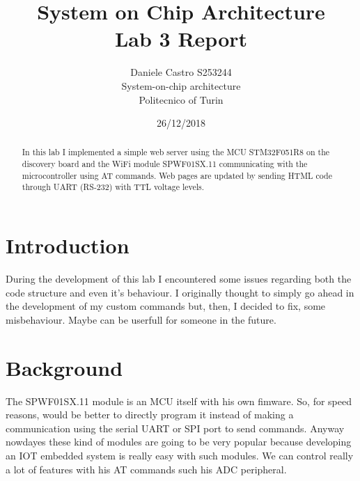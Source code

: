 \documentclass[peerreview]{IEEEtran}
\begin{document}
\title{System on Chip Architecture \\ Lab 3 Report}


\author{Daniele Castro S253244\\
System-on-chip architecture\\
Politecnico of Turin\\
}
\date{26/12/2018}

\maketitle
\tableofcontents
\listoffigures

\IEEEpeerreviewmaketitle
\begin{abstract}
In this lab I implemented a simple web server using the MCU STM32F051R8 on the discovery board and the WiFi module SPWF01SX.11 communicating with the microcontroller using AT commands. Web pages are updated by sending HTML code through UART (RS-232) with TTL voltage levels.
\end{abstract}
\section{Introduction}
During the development of this lab I encountered some issues regarding both the code structure and even it's behaviour. I originally thought to simply go ahead in the development of my custom commands but, then, I decided to fix, some misbehaviour. Maybe can be userfull for someone in the future.
\section{Background}
The SPWF01SX.11 module is an MCU itself with his own fimware. So, for speed reasons, would be better to directly program it instead of making a communication using the serial UART or SPI port to send commands. Anyway nowdayes these kind of modules are going to be very popular because developing an IOT embedded system is really easy with such modules. We can control really a lot of features with his AT commands such his ADC peripheral.
\end{document}
